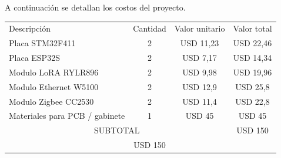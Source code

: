 \documentclass[
11pt%
]{charter}
\begin{document}
A continuación se detallan los costos del proyecto.



\begin{table}[htpb]
\centering
\begin{tabularx}{\linewidth}{@{}|X|c|r|r|@{}}
\hline
\rowcolor[HTML]{C0C0C0} 
\multicolumn{4}{|c|}{\cellcolor[HTML]{C0C0C0}COSTOS DIRECTOS} \\ \hline
\rowcolor[HTML]{C0C0C0} 
Descripción &
  \multicolumn{1}{c|}{\cellcolor[HTML]{C0C0C0}Cantidad} &
  \multicolumn{1}{c|}{\cellcolor[HTML]{C0C0C0}Valor unitario} &
  \multicolumn{1}{c|}{\cellcolor[HTML]{C0C0C0}Valor total} \\ \hline
  \multicolumn{1}{|l|}{Placa STM32F411}&
  \multicolumn{1}{c|}{2} & 
  \multicolumn{1}{c|}{USD 11,23} &
  \multicolumn{1}{c|}{USD 22,46} \\ \hline
  \multicolumn{1}{|l|}{Placa ESP32S}&
  \multicolumn{1}{c|}{2} &
  \multicolumn{1}{c|}{USD 7,17} &
  \multicolumn{1}{c|}{USD 14,34} \\ \hline
  \multicolumn{1}{|l|}{Modulo LoRA RYLR896} &
  \multicolumn{1}{c|}{2} &
  \multicolumn{1}{c|}{USD 9,98} &
  \multicolumn{1}{c|}{USD 19,96} \\ \hline
  \multicolumn{1}{|l|}{Modulo Ethernet W5100} &
  \multicolumn{1}{c|}{2} &
  \multicolumn{1}{c|}{USD 12,9} &
  \multicolumn{1}{c|}{USD 25,8} \\ \hline
  \multicolumn{1}{|l|}{Modulo Zigbee CC2530} &
  \multicolumn{1}{c|}{2} &
  \multicolumn{1}{c|}{USD 11,4} &
  \multicolumn{1}{c|}{USD 22,8} \\ \hline
  \multicolumn{1}{|l|}{Materiales para PCB / gabinete} &
  \multicolumn{1}{c|}{1} &
  \multicolumn{1}{c|}{USD 45} &
  \multicolumn{1}{c|}{USD 45} \\ \hline
\multicolumn{3}{|c|}{SUBTOTAL} &
  \multicolumn{1}{c|}{USD 150}\\ \hline
\rowcolor[HTML]{C0C0C0} 
\multicolumn{3}{|c|}{TOTAL} &{USD 150}
   \\ \hline
\end{tabularx}%
\end{table}
\end{document}
